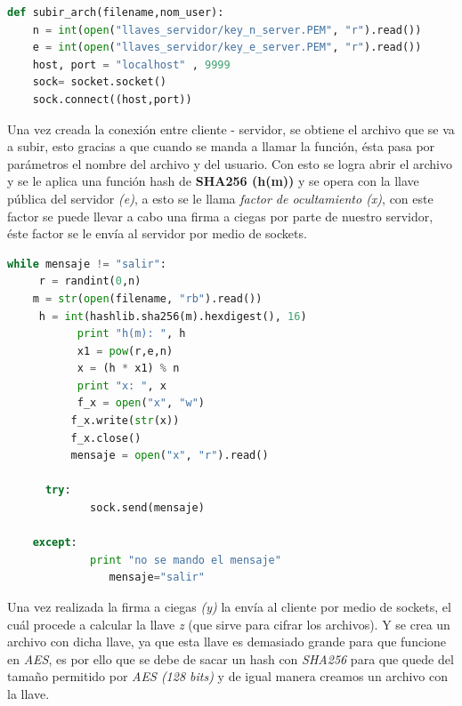 \begin{lstlisting}[language=Python,frame=single, keywordstyle=\color{blue},breaklines=true]
def subir_arch(filename,nom_user):
    n = int(open("llaves_servidor/key_n_server.PEM", "r").read())
    e = int(open("llaves_servidor/key_e_server.PEM", "r").read())
    host, port = "localhost" , 9999
    sock= socket.socket()
    sock.connect((host,port))
\end{lstlisting}


Una vez creada la conexión  entre cliente - servidor, se obtiene el archivo que se va a subir, esto gracias a que cuando se manda a llamar la función, ésta pasa por parámetros el nombre del archivo y del usuario. Con esto se logra abrir el archivo y se le aplica una función hash de \textbf{SHA256 (h(m))} y se opera con la llave pública del servidor \textit{(e)}, a esto se le llama \textit{factor de ocultamiento (x)}, con este factor se puede llevar a cabo una firma a ciegas por parte de nuestro servidor, éste factor se le envía al servidor por medio de  sockets.

\begin{lstlisting}[language=Python,frame=single, keywordstyle=\color{blue},breaklines=true, showstringspaces=false]
 while mensaje != "salir":
	 r = randint(0,n)
	m = str(open(filename, "rb").read())
	 h = int(hashlib.sha256(m).hexdigest(), 16)
           print "h(m): ", h
           x1 = pow(r,e,n)
           x = (h * x1) % n
           print "x: ", x
           f_x = open("x", "w")
          f_x.write(str(x))
          f_x.close()
          mensaje = open("x", "r").read() 

	  try:
           	 sock.send(mensaje)

	except:
           	 print "no se mando el mensaje"
            	mensaje="salir"
\end{lstlisting}

Una vez realizada la firma a ciegas \textit{(y)} la envía al cliente por medio de sockets, el cuál procede a calcular la llave \textit{z} (que sirve para cifrar los archivos). Y se crea un archivo con dicha llave, ya que esta llave es demasiado grande para que funcione en \textit{AES}, es por ello que se debe de sacar un hash con \textit{SHA256} para que quede del tamaño permitido por \textit{AES (128 bits)} y de igual manera creamos un archivo con la llave.

